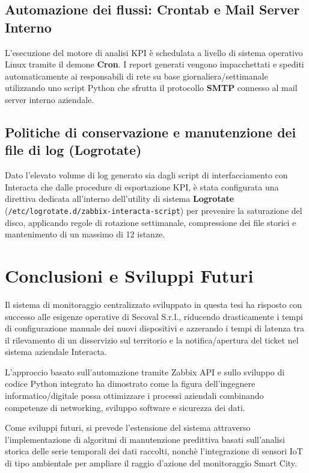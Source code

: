 \documentclass[12pt, a4paper]{report}
\begin{document}
\section{Automazione dei flussi: Crontab e Mail Server Interno}
L'esecuzione del motore di analisi KPI \`e schedulata a livello di sistema operativo Linux tramite il demone \textbf{Cron}. I report generati vengono impacchettati e spediti automaticamente ai responsabili di rete su base giornaliera/settimanale utilizzando uno script Python che sfrutta il protocollo \textbf{SMTP} connesso al mail server interno aziendale.

\section{Politiche di conservazione e manutenzione dei file di log (Logrotate)}
Dato l'elevato volume di log generato sia dagli script di interfacciamento con Interacta che dalle procedure di esportazione KPI, \`e stata configurata una direttiva dedicata all'interno dell'utility di sistema \textbf{Logrotate} (\texttt{/etc/logrotate.d/zabbix-interacta-script}) per prevenire la saturazione del disco, applicando regole di rotazione settimanale, compressione dei file storici e mantenimento di un massimo di 12 istanze.

\clearpage

\chapter*{Conclusioni e Sviluppi Futuri}
Il sistema di monitoraggio centralizzato sviluppato in questa tesi ha risposto con successo alle esigenze operative di Secoval S.r.l., riducendo drasticamente i tempi di configurazione manuale dei nuovi dispositivi e azzerando i tempi di latenza tra il rilevamento di un disservizio sul territorio e la notifica/apertura del ticket nel sistema aziendale Interacta.

L'approccio basato sull'automazione tramite Zabbix API e sullo sviluppo di codice Python integrato ha dimostrato come la figura dell'ingegnere informatico/digitale possa ottimizzare i processi aziendali combinando competenze di networking, sviluppo software e sicurezza dei dati.

Come sviluppi futuri, si prevede l'estensione del sistema attraverso l'implementazione di algoritmi di manutenzione predittiva basati sull'analisi storica delle serie temporali dei dati raccolti, nonch\`e l'integrazione di sensori IoT di tipo ambientale per ampliare il raggio d'azione del monitoraggio Smart City.
\end{document}
